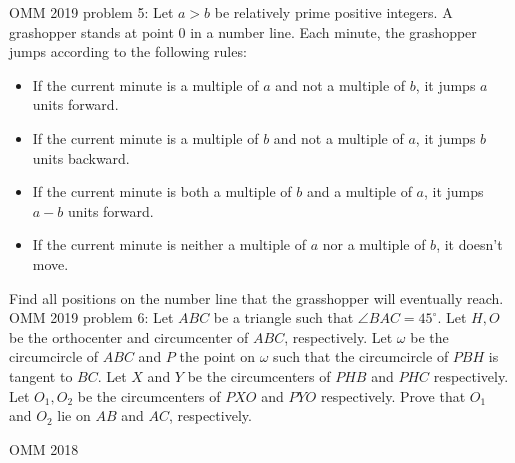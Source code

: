 OMM 2019 problem 5:  Let $a > b$ be relatively prime positive integers. A grashopper stands at point $0$ in a number line. Each minute, the grashopper jumps according to the following rules:
\begin{itemize}
  \item If the current minute is a multiple of $a$ and not a multiple of $b$, it jumps $a$ units forward.
  \item If the current minute is a multiple of $b$ and not a multiple of $a$, it jumps $b$ units backward.
  \item If the current minute is both a multiple of $b$ and a multiple of $a$, it jumps $a - b$ units forward.
  \item If the current minute is neither a multiple of $a$ nor a multiple of $b$, it doesn't move.
\end{itemize}
Find all positions on the number line that the grasshopper will eventually reach. 
OMM 2019 problem 6:  Let $ABC$ be a triangle such that $\angle BAC = 45^{\circ}$. Let $H,O$ be the orthocenter and circumcenter of $ABC$, respectively. Let $\omega$ be the circumcircle of $ABC$ and $P$ the point on $\omega$ such that the circumcircle of $PBH$ is tangent to $BC$. Let $X$ and $Y$ be the circumcenters of $PHB$ and $PHC$ respectively. Let $O_1,O_2$ be the circumcenters of $PXO$ and $PYO$ respectively. Prove that $O_1$ and $O_2$ lie on $AB$ and $AC$, respectively. 

OMM 2018 

